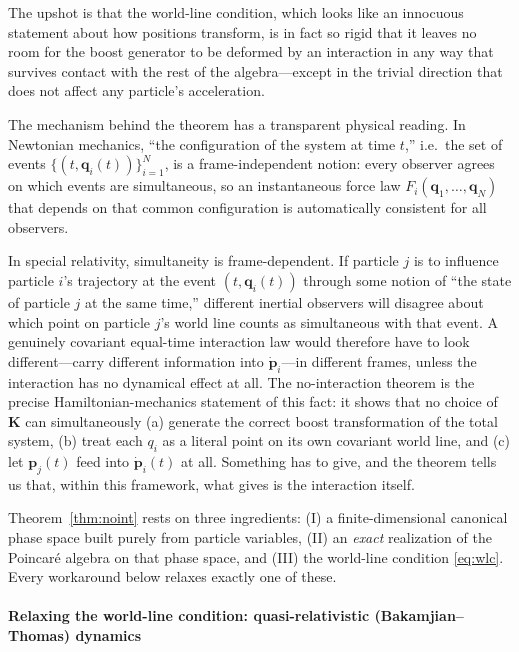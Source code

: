 The upshot is that the world-line condition, which looks like an innocuous
statement about how positions transform, is in fact so rigid that it leaves no
room for the boost generator to be deformed by an interaction in any way that
survives contact with the rest of the algebra---except in the trivial direction
that does not affect any particle's acceleration.

The mechanism behind the theorem has a transparent physical reading. In
Newtonian mechanics, ``the configuration of the system at time $t$,'' i.e.\ the
set of events $\{(t,{\bm q}_i(t))\}_{i=1}^N$, is a frame-independent notion: every
observer agrees on which events are simultaneous, so an instantaneous force law
$F_i({\bm q}_1,\dots,{\bm q}_N)$ that depends on that common configuration is
automatically consistent for all observers.

In special relativity, simultaneity is frame-dependent. If particle $j$ is to
influence particle $i$'s trajectory at the event $(t,{\bm q}_i(t))$ through some
notion of ``the state of particle $j$ at the same time,'' different inertial
observers will disagree about which point on particle $j$'s world line counts
as simultaneous with that event. A genuinely covariant equal-time interaction
law would therefore have to look different---carry different information into
$\dot{{\bm p}}_i$---in different frames, unless the interaction has no dynamical
effect at all. The no-interaction theorem is the precise Hamiltonian-mechanics
statement of this fact: it shows that no choice of ${\bm K}$ can simultaneously (a)
generate the correct boost transformation of the total system, (b) treat each
$q_i$ as a literal point on its own covariant world line, and (c) let
${\bm p}_j(t)$ feed into $\dot{{\bm p}}_i(t)$ at all. Something has to give, and the
theorem tells us that, within this framework, what gives is the interaction
itself.


Theorem~\ref{thm:noint} rests on three ingredients: (I) a finite-dimensional
canonical phase space built purely from particle variables, (II) an
\emph{exact} realization of the Poincar\'e algebra on that phase space, and
(III) the world-line condition \eqref{eq:wlc}. Every workaround below relaxes
exactly one of these.

\paragraph{Relaxing the world-line condition: quasi-relativistic (Bakamjian--Thomas) dynamics}

